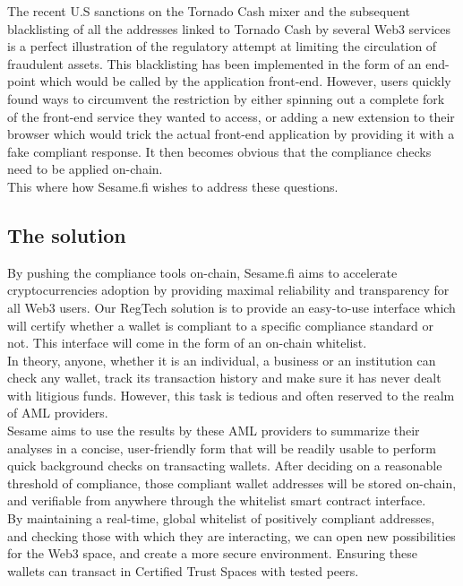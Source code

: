 ﻿\documentclass[a4paper]{article}
\let\OldTexttrademark\texttrademark
\renewcommand{\texttrademark}{\OldTexttrademark\xspace}%
\begin{document}
The recent U.S sanctions on the Tornado Cash mixer and the subsequent blacklisting of all the addresses linked to Tornado Cash by several Web3 services is a perfect illustration of the regulatory attempt at limiting the circulation of fraudulent assets. This blacklisting has been implemented in the form of an end-point which would be called by the application front-end. However, users quickly found ways to circumvent the restriction by either spinning out a complete fork of the front-end service they wanted to access, or adding a new extension to their browser which would trick the actual front-end application by providing it with a fake compliant response.
It then becomes obvious that the compliance checks need to be applied on-chain. \\


This where how Sesame.fi wishes to address these questions.
\subsection{The solution}
By pushing the compliance tools on-chain, Sesame.fi aims to accelerate cryptocurrencies adoption by providing maximal reliability and transparency for all Web3 users. Our RegTech solution is to provide an easy-to-use interface which will certify whether a wallet is compliant to a specific compliance standard or not. This interface will come in the form of an on-chain whitelist. \\

In theory, anyone, whether it is an individual, a business or an institution can check any wallet, track its transaction history and make sure it has never dealt with litigious funds. However, this task is tedious and often reserved to the realm of AML providers. \\

Sesame aims to use the results by these AML providers to summarize their analyses in a concise, user-friendly form that will be readily usable to perform quick background checks on transacting wallets. After deciding on a reasonable threshold of compliance, those compliant wallet addresses will be stored on-chain, and verifiable from anywhere through the whitelist smart contract interface. \\

By maintaining a real-time, global whitelist of positively compliant addresses, and checking those with which they are interacting, we can open new possibilities for the Web3 space, and create a more secure environment. Ensuring these wallets can transact in Certified Trust Spaces\texttrademark with tested peers. \\
\end{document}
